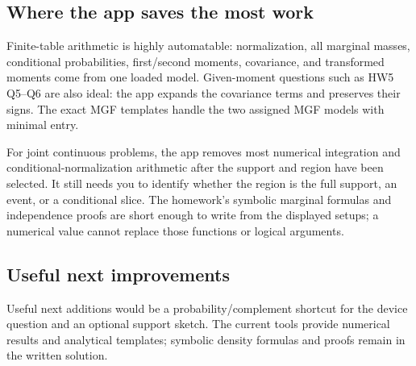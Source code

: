 \subsection*{Where the app saves the most work}
Finite-table arithmetic is highly automatable: normalization, all marginal masses, conditional probabilities, first/second moments, covariance, and transformed moments come from one loaded model. Given-moment questions such as HW5 Q5--Q6 are also ideal: the app expands the covariance terms and preserves their signs. The exact MGF templates handle the two assigned MGF models with minimal entry.

For joint continuous problems, the app removes most numerical integration and conditional-normalization arithmetic after the support and region have been selected. It still needs you to identify whether the region is the full support, an event, or a conditional slice. The homework's symbolic marginal formulas and independence proofs are short enough to write from the displayed setups; a numerical value cannot replace those functions or logical arguments.

\subsection*{Useful next improvements}
Useful next additions would be a probability/complement shortcut for the device question and an optional support sketch. The current tools provide numerical results and analytical templates; symbolic density formulas and proofs remain in the written solution.
